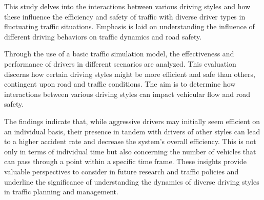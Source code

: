 This study delves into the interactions between various driving styles and how these influence the efficiency and safety of traffic
with diverse driver types in fluctuating traffic situations. Emphasis is laid on understanding the influence of different driving behaviors
on traffic dynamics and road safety.

Through the use of a basic traffic simulation model, the effectiveness and performance of drivers in different scenarios are analyzed.
This evaluation discerns how certain driving styles might be more efficient and safe than others, contingent upon road and traffic conditions.
The aim is to determine how interactions between various driving styles can impact vehicular flow and road safety.

The findings indicate that, while aggressive drivers may initially seem efficient on an individual basis, their presence in tandem with
drivers of other styles can lead to a higher accident rate and decrease the system's overall efficiency. This is not only in terms of individual
time but also concerning the number of vehicles that can pass through a point within a specific time frame.
These insights provide valuable perspectives to consider in future research and traffic policies and underline the significance of understanding
the dynamics of diverse driving styles in traffic planning and management.